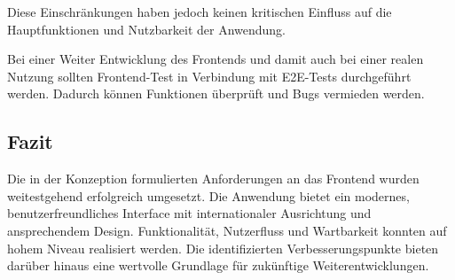 Diese Einschränkungen haben jedoch keinen kritischen Einfluss auf die Hauptfunktionen und Nutzbarkeit der Anwendung.

Bei einer Weiter Entwicklung des Frontends und damit auch bei einer realen Nutzung sollten Frontend-Test in Verbindung mit E2E-Tests durchgeführt werden. Dadurch können Funktionen überprüft und Bugs vermieden werden. 

\subsection{Fazit}

Die in der Konzeption formulierten Anforderungen an das Frontend wurden weitestgehend erfolgreich umgesetzt. Die Anwendung bietet ein modernes, benutzerfreundliches Interface mit internationaler Ausrichtung und ansprechendem Design. Funktionalität, Nutzerfluss und Wartbarkeit konnten auf hohem Niveau realisiert werden. Die identifizierten Verbesserungspunkte bieten darüber hinaus eine wertvolle Grundlage für zukünftige Weiterentwicklungen.